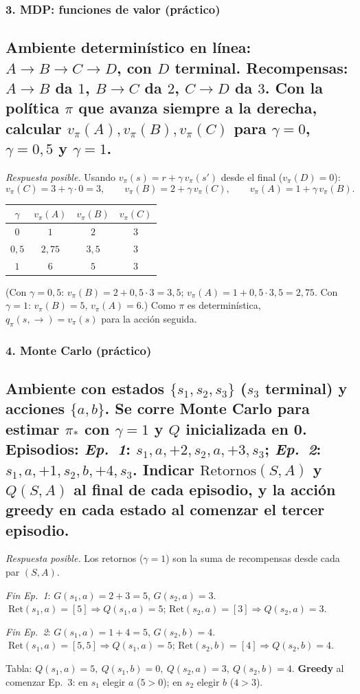 \documentclass[11pt, a4paper]{article}
\newcommand{\pregunta}[1]{\subsection{#1}}
\newcommand{\eje}[1]{\subsubsection{#1}}
\begin{document}
\eje{3. MDP: funciones de valor (pr\'actico)}
\pregunta{Ambiente determin\'istico en l\'inea: $A \to B \to C \to D$, con $D$ terminal. Recompensas: $A\to B$ da $1$, $B\to C$ da $2$, $C\to D$ da $3$. Con la pol\'itica $\pi$ que avanza siempre a la derecha, calcular $v_\pi(A), v_\pi(B), v_\pi(C)$ para $\gamma = 0$, $\gamma = 0{,}5$ y $\gamma = 1$.}

\begin{respuesta}
\textit{Respuesta posible.} Usando $v_\pi(s) = r + \gamma\, v_\pi(s')$ desde el final ($v_\pi(D)=0$):
\[
v_\pi(C)=3+\gamma\cdot 0=3,\qquad v_\pi(B)=2+\gamma\, v_\pi(C),\qquad v_\pi(A)=1+\gamma\, v_\pi(B).
\]
\begin{center}
\begin{tabular}{c c c c}
\toprule
$\gamma$ & $v_\pi(A)$ & $v_\pi(B)$ & $v_\pi(C)$ \\
\midrule
$0$   & $1$    & $2$   & $3$ \\
$0{,}5$ & $2{,}75$ & $3{,}5$ & $3$ \\
$1$   & $6$    & $5$   & $3$ \\
\bottomrule
\end{tabular}
\end{center}
(Con $\gamma=0{,}5$: $v_\pi(B)=2+0{,}5\cdot3=3{,}5$; $v_\pi(A)=1+0{,}5\cdot3{,}5=2{,}75$.
Con $\gamma=1$: $v_\pi(B)=5$, $v_\pi(A)=6$.) Como $\pi$ es determin\'istica, $q_\pi(s,\rightarrow)=v_\pi(s)$ para la acci\'on seguida.
\end{respuesta}

\eje{4. Monte Carlo (pr\'actico)}
\pregunta{Ambiente con estados $\{s_1, s_2, s_3\}$ ($s_3$ terminal) y acciones $\{a,b\}$. Se corre Monte Carlo para estimar $\pi_*$ con $\gamma=1$ y $Q$ inicializada en 0. Episodios:
\emph{Ep.\ 1}: $s_1, a, {+}2, s_2, a, {+}3, s_3$; \quad \emph{Ep.\ 2}: $s_1, a, {+}1, s_2, b, {+}4, s_3$.
Indicar $\mathrm{Retornos}(S,A)$ y $Q(S,A)$ al final de cada episodio, y la acci\'on greedy en cada estado al comenzar el tercer episodio.}

\begin{respuesta}
\textit{Respuesta posible.} Los retornos ($\gamma=1$) son la suma de recompensas desde cada par $(S,A)$.

\emph{Fin Ep.\ 1}: $G(s_1,a)=2+3=5$, $G(s_2,a)=3$.
$\;\mathrm{Ret}(s_1,a)=[5]\Rightarrow Q(s_1,a)=5$;\; $\mathrm{Ret}(s_2,a)=[3]\Rightarrow Q(s_2,a)=3$.

\emph{Fin Ep.\ 2}: $G(s_1,a)=1+4=5$, $G(s_2,b)=4$.
$\;\mathrm{Ret}(s_1,a)=[5,5]\Rightarrow Q(s_1,a)=5$;\; $\mathrm{Ret}(s_2,b)=[4]\Rightarrow Q(s_2,b)=4$.

Tabla: $Q(s_1,a)=5,\ Q(s_1,b)=0,\ Q(s_2,a)=3,\ Q(s_2,b)=4$.
\textbf{Greedy} al comenzar Ep.\ 3: en $s_1$ elegir $a$ ($5>0$); en $s_2$ elegir $b$ ($4>3$).
\end{respuesta}
\end{document}
